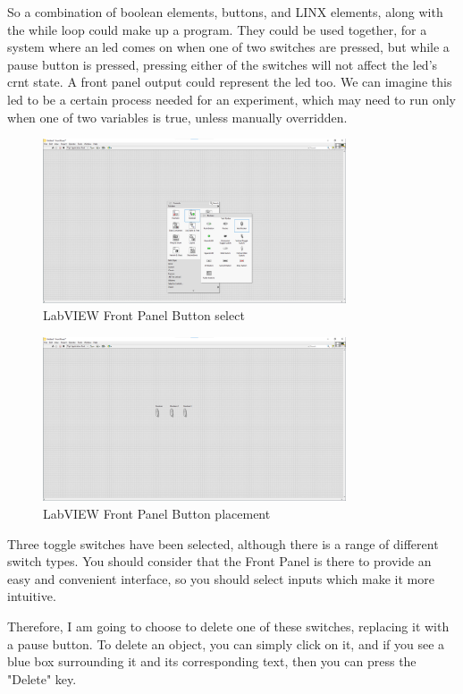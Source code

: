 \documentclass[a4paper,11pt]{report}
\begin{document}
So a combination of boolean elements, buttons, and LINX elements, along with the while loop could make up a program. They could be used together, for a system where an \gls{led} comes on when one of two switches are pressed, but while a pause button is pressed, pressing either of the switches will not affect the \gls{led}'s \gls{crnt} state. A front panel output could represent the \gls{led} too. We can imagine this \gls{led} to be a certain process needed for an experiment, which may need to run only when one of two variables is true, unless manually overridden.

\begin{figure}[H]
\centering
\includegraphics[width=0.8\textwidth]{screenshots/labview10}
\caption{LabVIEW Front Panel Button select}
\end{figure}

\begin{figure}[H]
\centering
\includegraphics[width=0.8\textwidth]{screenshots/labview11}
\caption{LabVIEW Front Panel Button placement}
\end{figure}

Three toggle switches have been selected, although there is a range of different switch types. You should consider that the Front Panel is there to provide an easy and convenient interface, so you should select inputs which make it more intuitive.

Therefore, I am going to choose to delete one of these switches, replacing it with a pause button. To delete an object, you can simply click on it, and if you see a blue box surrounding it and its corresponding text, then you can press the "Delete" key.
\end{document}
